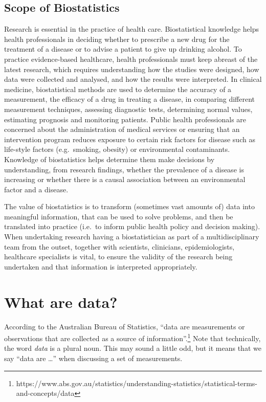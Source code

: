 \documentclass[
  a4paper,
]{memoir}
\begin{document}
\hypertarget{scope-of-biostatistics}{%
\subsection{Scope of Biostatistics}\label{scope-of-biostatistics}}

Research is essential in the practice of health care. Biostatistical
knowledge helps health professionals in deciding whether to prescribe a
new drug for the treatment of a disease or to advise a patient to give
up drinking alcohol. To practice evidence-based healthcare, health
professionals must keep abreast of the latest research, which requires
understanding how the studies were designed, how data were collected and
analysed, and how the results were interpreted. In clinical medicine,
biostatistical methods are used to determine the accuracy of a
measurement, the efficacy of a drug in treating a disease, in comparing
different measurement techniques, assessing diagnostic tests,
determining normal values, estimating prognosis and monitoring patients.
Public health professionals are concerned about the administration of
medical services or ensuring that an intervention program reduces
exposure to certain risk factors for disease such as life-style factors
(e.g.~smoking, obesity) or environmental contaminants. Knowledge of
biostatistics helps determine them make decisions by understanding, from
research findings, whether the prevalence of a disease is increasing or
whether there is a causal association between an environmental factor
and a disease.

The value of biostatistics is to transform (sometimes vast amounts of)
data into meaningful information, that can be used to solve problems,
and then be translated into practice (i.e.~to inform public health
policy and decision making). When undertaking research having a
biostatistician as part of a multidisciplinary team from the outset,
together with scientists, clinicians, epidemiologists, healthcare
specialists is vital, to ensure the validity of the research being
undertaken and that information is interpreted appropriately.

\hypertarget{what-are-data}{%
\section{What are data?}\label{what-are-data}}

According to the Australian Bureau of Statistics, ``data are
measurements or observations that are collected as a source of
information''.\footnote{https://www.abs.gov.au/statistics/understanding-statistics/statistical-terms-and-concepts/data}
Note that technically, the word \emph{data} is a plural noun. This may
sound a little odd, but it means that we say ``data are \ldots{}'' when
discussing a set of measurements.
\end{document}
